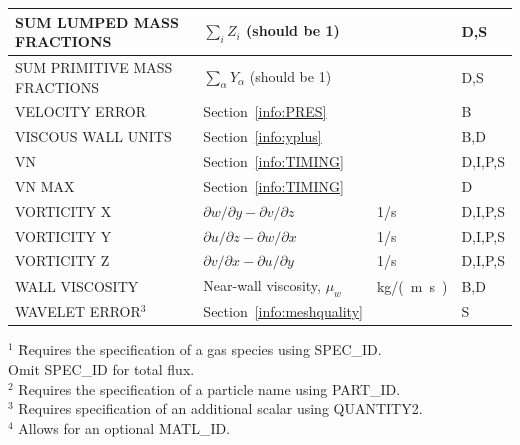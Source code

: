 \documentclass[11pt]{book}
\begin{document}
\begin{longtable}{@{\extracolsep{\fill}}|l|l|l|l|}
{\ct SUM LUMPED MASS FRACTIONS}                 & $\sum_i Z_i$ (should be 1)                        &                & D,S          \\ \hline
{\ct SUM PRIMITIVE MASS FRACTIONS}              & $\sum_\alpha Y_\alpha$ (should be 1)              &                & D,S          \\ \hline
{\ct VELOCITY ERROR}                            & Section~\ref{info:PRES}                           &                & B            \\ \hline
{\ct VISCOUS WALL UNITS}                        & Section~\ref{info:yplus}                          &                & B,D          \\ \hline
{\ct VN}                                        & Section~\ref{info:TIMING}                         &                & D,I,P,S      \\ \hline
{\ct VN MAX}                                    & Section~\ref{info:TIMING}                         &                & D            \\ \hline
{\ct VORTICITY X}                               & $\partial w/\partial y - \partial v/\partial z$   & 1/s            & D,I,P,S      \\ \hline
{\ct VORTICITY Y}                               & $\partial u/\partial z - \partial w/\partial x$   & 1/s            & D,I,P,S      \\ \hline
{\ct VORTICITY Z}                               & $\partial v/\partial x - \partial u/\partial y$   & 1/s            & D,I,P,S      \\ \hline
{\ct WALL VISCOSITY}                            & Near-wall viscosity, $\mu_w$                      & \si{kg/(m.s)}  & B,D          \\ \hline
{\ct WAVELET ERROR}$^3$                         & Section~\ref{info:meshquality}                    &                & S            \\ \hline
\end{longtable}

\noindent
\begin{tabbing}
$^1$ \hspace{0.05in} \= Requires the specification of a gas species using {\ct SPEC\_ID}. \\
                     \> Omit {\ct SPEC\_ID} for total flux. \\
$^2$                 \> Requires the specification of a particle name using {\ct PART\_ID}. \\
$^3$                 \> Requires specification of an additional scalar using {\ct QUANTITY2}. \\
$^4$                 \> Allows for an optional {\ct MATL\_ID}.
\end{tabbing}
\end{document}
